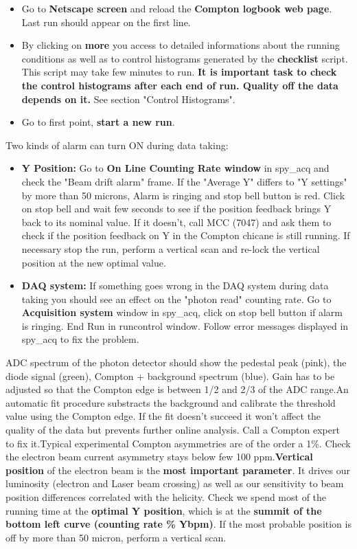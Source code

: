 {\begin{itemize}
indicating that the run is saved and the online analysis (checklist) is 
runnig.
\item Go to {\bf Netscape screen} and reload the {\bf Compton logbook web 
page}. Last run should appear on the first line. 
\item By clicking on {\bf more} you access to detailed informations about 
the running conditions as well as to control histograms generated by the 
{\bf checklist} script. This script may take few minutes to run.
{\bf It is important task to check the control histograms after each end of 
run. Quality off the data depends on it.} See section "Control Histograms".
\item Go to first point, {\bf start a new run}. 
\end{itemize}

Two kinds of alarm can turn ON during data taking:

\begin{itemize}
\item {\bf Y Position:} Go to {\bf On Line Counting Rate window} in spy\_acq and check 
the "Beam drift alarm" frame. If the "Average Y" differs to "Y settings" by more than 
50 microns, Alarm is ringing and stop bell button is red. Click on stop bell and 
wait few seconds to see if the position feedback brings Y back to its nominal 
value. If it doesn't, call MCC (7047) and ask them to check if the position 
feedback on Y in the Compton chicane is still running.
If necessary stop the run, perform a vertical scan and re-lock the vertical 
position at the new optimal value.
\item {\bf DAQ system:} If something goes wrong in the DAQ system during data 
taking you should see an effect on the "photon read" counting rate. Go to 
{\bf Acquisition system} window in spy\_acq, click on stop bell button if alarm is 
ringing. End Run in runcontrol window. Follow error messages displayed in spy\_acq 
to fix the problem.
\end{itemize}

ADC spectrum of the photon detector should show the 
pedestal peak
(pink), the diode signal (green), Compton + background spectrum (blue). 
Gain has to be adjusted so that the Compton edge is between 1/2 and 2/3 
of the ADC range.An automatic fit procedure substracts the background and calibrate 
the threshold value using the Compton edge. If the fit doesn't succeed 
it won't affect the quality of the data but prevents further online 
analysis. Call a Compton expert to fix it.Typical experimental Compton asymmetries 
are of the order a 1\%. 
Check the electron beam current asymmetry stays below few 100 ppm.{\bf Vertical position} 
of the electron beam is the {\bf most important parameter}. 
It drives our luminosity (electron and Laser 
beam crossing) as well as our sensitivity to beam position differences 
correlated with the helicity.
Check we spend most of the running time at the {\bf optimal Y position}, 
which is at the {\bf summit of the bottom left curve (counting rate \% Ybpm)}.
If the most probable position is off by more than 50 micron, perform a 
vertical scan.


}
